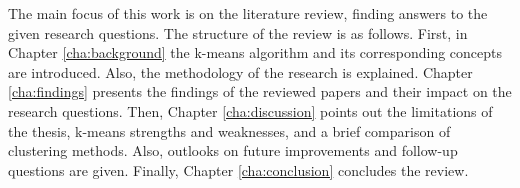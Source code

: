 The main focus of this work is on the literature review, finding answers to the given research questions.
The structure of the review is as follows.
First, in Chapter \ref{cha:background} the k-means algorithm and its corresponding concepts are introduced.
Also, the methodology of the research is explained.
Chapter \ref{cha:findings} presents the findings of the reviewed papers and their impact on the research questions.
Then, Chapter \ref{cha:discussion} points out the limitations of the thesis, k-means strengths and weaknesses, and a brief comparison of clustering methods.
Also, outlooks on future improvements and follow-up questions are given.
Finally, Chapter \ref{cha:conclusion} concludes the review.